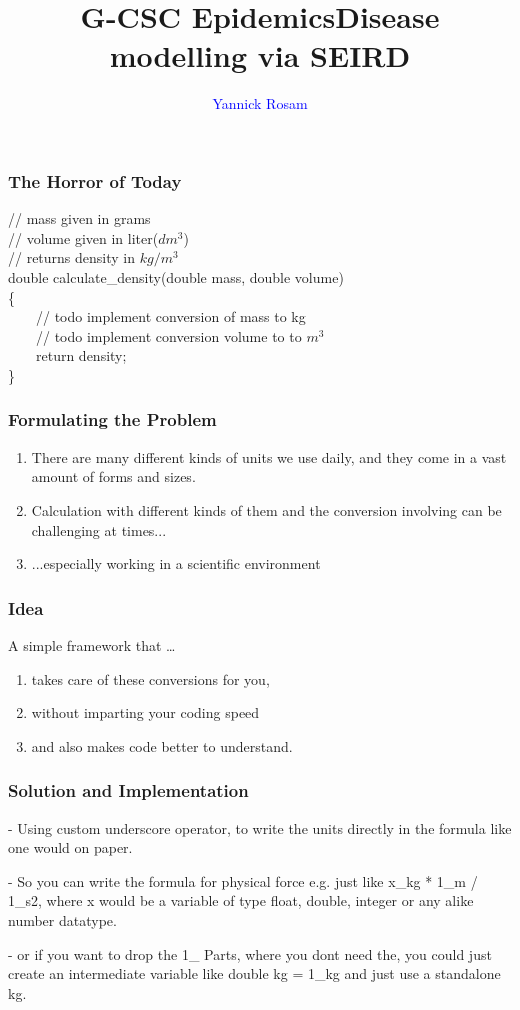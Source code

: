 \documentclass{beamer}
\title[Epidemics Wokrshop]{G-CSC Epidemics\newline Disease modelling via SEIRD}
\author{\textcolor{blue}{Yannick Rosam\\}}
\institute[G-CSC] %
{
Goethe - Center for Scientific Computing \\ %
\medskip
}
\begin{document}
\begin{frame}
\frametitle{The Horror of Today}
        // mass given in grams\\
        // volume given in liter($dm^3$)\\
        // returns density in $kg/m^3$\\
        double calculate\_density(double mass, double volume)\\
        \{\\
        \ \ \ \ // todo implement conversion of mass to kg\\
        \ \ \ \ // todo implement conversion volume to to $m^{3}$\\
        \ \ \ \ return density;\\
        \}
\end{frame}

\begin{frame}
\frametitle{Formulating the Problem}
\begin{enumerate}
\item There are many different kinds of units we use daily, and they come in a vast amount of forms and sizes.
\item Calculation with different kinds of them and the conversion involving can be challenging at times...
\item ...especially working in a scientific environment
\end{enumerate}
\end{frame}
\begin{frame}

\frametitle{Idea}
A simple framework that \ldots
\begin{enumerate}[label=\ldots]
\item takes care of these conversions for you,
\item without imparting your coding speed 
\item and also makes code better to understand.
\end{enumerate}

\end{frame}

\begin{frame}
\frametitle{Solution and Implementation}

- Using custom underscore operator, to write the units directly in the formula like one would on paper.

- So you can write the formula for physical force e.g. just like x\_kg * 1\_m / 1\_s2, where x would be a variable of type float, double, integer or any alike number datatype.

- or if you want to drop the 1\_ Parts, where you dont need the, you could just create an intermediate variable like double kg = 1\_kg and just use a standalone kg.
\end{frame}
\end{document}
